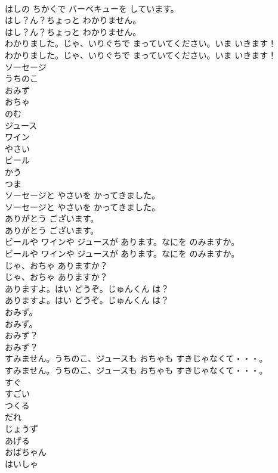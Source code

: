 \documentclass[8pt]{extreport}
\begin{document}
\begin{CJK}{UTF8}{min}
\\	はしの ちかくで バーベキューを しています。
\\	はし？ん？ちょっと わかりません。
\\	はし？ん？ちょっと わかりません。
\\	わかりました。じゃ、いりぐちで まっていてください。いま いきます！
\\	わかりました。じゃ、いりぐちで まっていてください。いま いきます！
\\	ソーセージ
\\	うちのこ
\\	おみず
\\	おちゃ
\\	のむ
\\	ジュース
\\	ワイン
\\	やさい
\\	ビール
\\	かう
\\	つま
\\	ソーセージと やさいを かってきました。
\\	ソーセージと やさいを かってきました。
\\	ありがとう ございます。
\\	ありがとう ございます。
\\	ビールや ワインや ジュースが あります。なにを のみますか。
\\	ビールや ワインや ジュースが あります。なにを のみますか。
\\	じゃ、おちゃ ありますか？
\\	じゃ、おちゃ ありますか？
\\	ありますよ。はい どうぞ。じゅんくん は？
\\	ありますよ。はい どうぞ。じゅんくん は？
\\	おみず。
\\	おみず。
\\	おみず？
\\	おみず？
\\	すみません。うちのこ、ジュースも おちゃも すきじゃなくて・・・。
\\	すみません。うちのこ、ジュースも おちゃも すきじゃなくて・・・。
\\	すぐ
\\	すごい
\\	つくる
\\	だれ
\\	じょうず
\\	あげる
\\	おばちゃん
\\	はいしゃ

\end{CJK}
\end{document}
